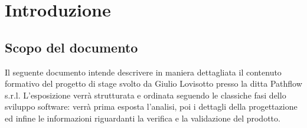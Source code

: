 
\section{Introduzione} \label{sec:greetings}
\subsection{Scopo del documento} %
Il seguente documento intende descrivere in maniera dettagliata il contenuto formativo del progetto di stage svolto da Giulio Lovisotto presso la ditta Pathflow s.r.l. L'esposizione verrà strutturata e ordinata seguendo le classiche fasi dello sviluppo software: verrà prima esposta l'analisi, poi i dettagli della progettazione ed infine le informazioni riguardanti la verifica e la validazione del prodotto.

